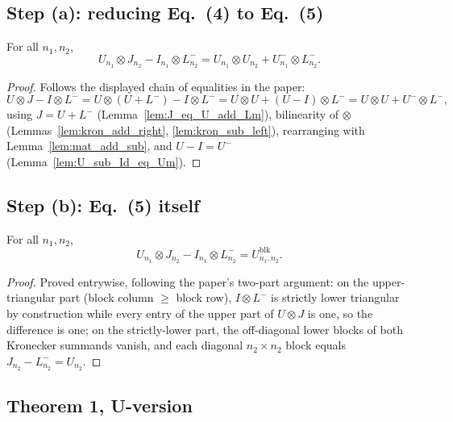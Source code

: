 \subsection{Step (a): reducing Eq.~(4) to Eq.~(5)}

\begin{lemma}
  \label{lem:eq5_rhs}
  \leanok
  For all $n_1, n_2$,
  \[
    U_{n_1} \otimes J_{n_2} - I_{n_1} \otimes L^-_{n_2}
      = U_{n_1} \otimes U_{n_2} + U^-_{n_1} \otimes L^-_{n_2}.
  \]
\end{lemma}
\begin{proof}
  Follows the displayed chain of equalities in the paper:
  \[
    U \otimes J - I \otimes L^-
      = U \otimes (U + L^-) - I \otimes L^-
      = U \otimes U + (U - I) \otimes L^-
      = U \otimes U + U^- \otimes L^-,
  \]
  using $J = U + L^-$ (Lemma~\ref{lem:J_eq_U_add_Lm}), bilinearity of
  $\otimes$ (Lemmas~\ref{lem:kron_add_right}, \ref{lem:kron_sub_left}),
  rearranging with Lemma~\ref{lem:mat_add_sub}, and $U - I = U^-$
  (Lemma~\ref{lem:U_sub_Id_eq_Um}).
\end{proof}

\subsection{Step (b): Eq.~(5) itself}

\begin{lemma}[Eq.~(5)]
  \label{lem:eq5}
  \leanok
  For all $n_1, n_2$,
  \[
    U_{n_1} \otimes J_{n_2} - I_{n_1} \otimes L^-_{n_2} = U^{\mathrm{blk}}_{n_1,n_2}.
  \]
\end{lemma}
\begin{proof}
  Proved entrywise, following the paper's two-part argument: on the
  upper-triangular part (block column $\ge$ block row), $I \otimes L^-$
  is strictly lower triangular by construction while every entry of the
  upper part of $U \otimes J$ is one, so the difference is one; on the
  strictly-lower part, the off-diagonal lower blocks of both Kronecker
  summands vanish, and each diagonal $n_2 \times n_2$ block equals
  $J_{n_2} - L^-_{n_2} = U_{n_2}$.
\end{proof}

\subsection{Theorem 1, U-version}


